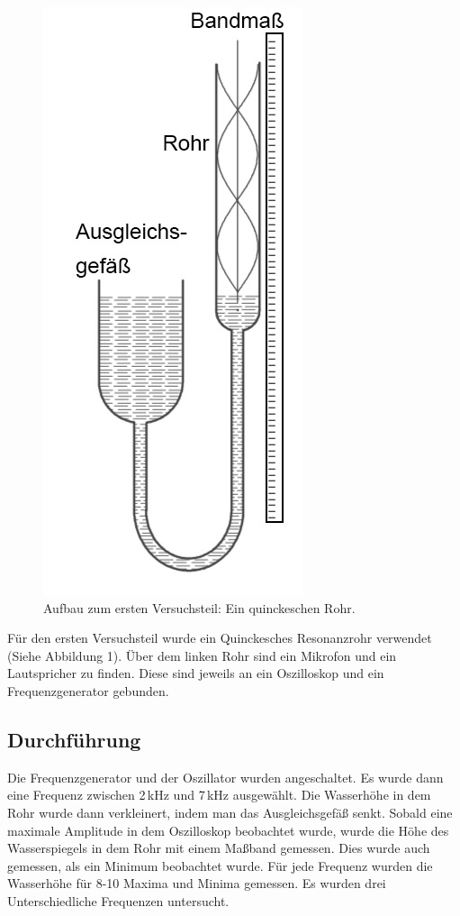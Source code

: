 \documentclass[11pt,a4paper]{article}
\newcommand{\halftime}[4]{\begin{figure}[h]
\begin{minipage}{.#1\textwidth}#3\end{minipage}\begin{minipage}{.#2\textwidth}
\centering
#4\end{minipage}
\end{figure}}
\begin{document}
\begin{figure}
	\centering
	\includegraphics[scale=0.5]{Abb1}
	\caption{Aufbau zum ersten Versuchsteil: Ein quinckeschen Rohr.}
\end{figure}
Für den ersten Versuchsteil wurde ein Quinckesches Resonanzrohr verwendet (Siehe Abbildung 1). \"Uber dem linken Rohr sind ein Mikrofon und ein Lautspricher zu finden. Diese sind jeweils an ein Oszilloskop und ein Frequenzgenerator gebunden.


\subsection{Durchführung}
Die Frequenzgenerator und der Oszillator wurden angeschaltet. Es wurde dann eine Frequenz zwischen 2\,kHz und 7\,kHz ausgewählt. Die Wasserhöhe in dem Rohr wurde dann verkleinert, indem man das Ausgleichsgefäß senkt. Sobald eine maximale Amplitude in dem Oszilloskop beobachtet wurde, wurde die Höhe des Wasserspiegels in dem Rohr mit einem Maßband gemessen. Dies wurde auch gemessen, als ein Minimum beobachtet wurde. Für jede Frequenz wurden die Wasserhöhe für 8-10 Maxima und Minima gemessen. Es wurden drei Unterschiedliche Frequenzen untersucht. 
\end{document}
